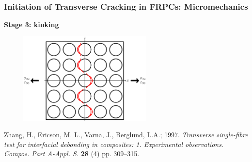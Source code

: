 \documentclass[first,firstsupp,lastsupp,last,hyperref,table]{ETHclass}
\begin{document}
\begin{frame}
\frametitle{\vspace{0.2cm}\small Initiation of Transverse Cracking in FRPCs: Micromechanics}
\vspace{-0.75cm}
\centering
\begin{alertblock}{\centering\scriptsize\bf Stage 3: kinking}
\begin{figure}
\centering
\includegraphics[width=0.6\textwidth]{stage3-kinking.pdf}
\end{figure}
\end{alertblock}
\vspace{-0.5cm}
{\tiny Zhang, H., Ericson, M. L., Varna, J., Berglund, L.A.; 1997. {\em\tiny Transverse single-fibre test for interfacial debonding in composites: 1. Experimental observations}. {\it\tiny Compos. Part A-Appl. S.} {\bf\tiny 28} (4) pp. 309--315.}
\end{frame}
\end{document}
